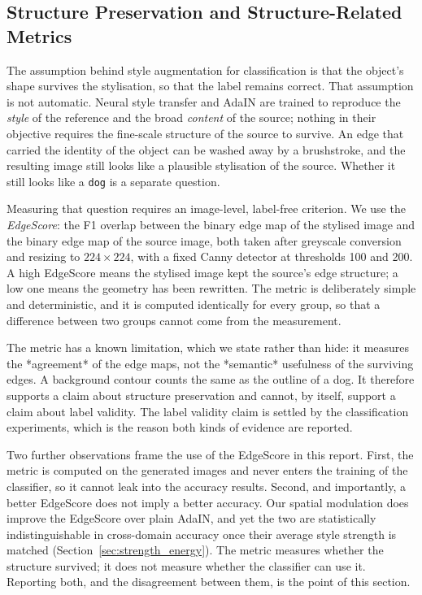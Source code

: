 \subsection{Structure Preservation and Structure-Related Metrics}
\label{sec:structure}

The assumption behind style augmentation for classification is that the
object's shape survives the stylisation, so that the label remains correct.
That assumption is not automatic. Neural style transfer and AdaIN are
trained to reproduce the \emph{style} of the reference and the broad
\emph{content} of the source; nothing in their objective requires the
fine-scale structure of the source to survive. An edge that carried the
identity of the object can be washed away by a brushstroke, and the
resulting image still looks like a plausible stylisation of the source.
Whether it still looks like a \texttt{dog} is a separate question.

Measuring that question requires an image-level, label-free criterion. We
use the \emph{EdgeScore}: the F1 overlap between the binary edge map of the
stylised image and the binary edge map of the source image, both taken after
greyscale conversion and resizing to $224\times224$, with a fixed Canny
detector at thresholds 100 and 200. A high EdgeScore means the stylised
image kept the source's edge structure; a low one means the geometry has
been rewritten. The metric is deliberately simple and deterministic, and it
is computed identically for every group, so that a difference between two
groups cannot come from the measurement.

The metric has a known limitation, which we state rather than hide: it
measures the *agreement* of the edge maps, not the *semantic* usefulness of
the surviving edges. A background contour counts the same as the outline of
a dog. It therefore supports a claim about structure preservation and
cannot, by itself, support a claim about label validity. The label validity
claim is settled by the classification experiments, which is the reason both
kinds of evidence are reported.

Two further observations frame the use of the EdgeScore in this report.
First, the metric is computed on the generated images and never enters the
training of the classifier, so it cannot leak into the accuracy results.
Second, and importantly, a better EdgeScore does not imply a better
accuracy. Our spatial modulation does improve the EdgeScore over plain
AdaIN, and yet the two are statistically indistinguishable in cross-domain
accuracy once their average style strength is matched
(Section~\ref{sec:strength_energy}). The metric measures whether the
structure survived; it does not measure whether the classifier can use it.
Reporting both, and the disagreement between them, is the point of this
section.
